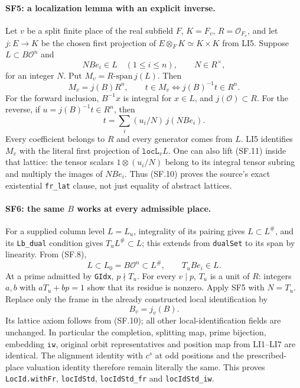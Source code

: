 \documentclass[11pt,a4paper]{article}
\numberwithin{equation}{section}
\theoremstyle{remark}\newtheorem{remark}[theorem]{Remark}
\begin{document}
\paragraph{SF5: a localization lemma with an explicit inverse.}
Let $v$ be a split finite place of the real subfield $F$,
$K=F_v$, $R=\mathcal O_{F_v}$, and let
$j:E\to K$ be the chosen first projection of
$E\otimes_FK\simeq K\times K$ from LI5.
Suppose $L\subset B\mathcal O^n$ and
\[
 N B e_i\in L\quad(1\le i\le n),\qquad N\in R^\times,
                                                               \tag{SF.9}
\]
for an integer $N$. Put $M_v=R\text{-span}\,j(L)$.
Then
\[
 M_v=j(B)R^n,\qquad
 t\in M_v\Longleftrightarrow j(B)^{-1}t\in R^n.         \tag{SF.10}
\]
For the forward inclusion, $B^{-1}x$ is integral for $x\in L$,
and $j(\mathcal O)\subset R$. For the reverse, if
$u=j(B)^{-1}t\in R^n$, then
\[
 t=\sum_i (u_i/N)\,j(NBe_i).                           \tag{SF.11}
\]
Every coefficient belongs to $R$ and every generator comes from $L$.
LI5 identifies $M_v$ with the literal first projection of
$\texttt{locL}_vL$. One can also lift (SF.11) inside that lattice:
the tensor scalars $1\otimes(u_i/N)$ belong to its integral tensor
subring and multiply the images of $NBe_i$. Thus (SF.10) proves the
source's exact existential \texttt{fr\_lat} clause, not just equality
of abstract lattices.

\paragraph{SF6: the same $B$ works at every admissible place.}
For a supplied column level $L=L_u$, integrality of its pairing gives
$L\subset L^\#$, and its \texttt{Lb\_dual} condition gives
$T_u L^\#\subset L$; this extends from \texttt{dualSet} to its span
by linearity. From (SF.8),
\[
 L\subset L_0=B\mathcal O^n\subset L^\#,
 \qquad T_uBe_i\in L.                                  \tag{SF.12}
\]
At a prime admitted by \texttt{GIdx}, $p\nmid T_u$. For every
$v\mid p$, $T_u$ is a unit of $R$: integers $a,b$ with
$aT_u+bp=1$ show that its residue is nonzero. Apply SF5 with $N=T_u$.
Replace only the frame in the already constructed local identification by
\[
 B_v=j_v(B).                                             \tag{SF.13}
\]
Its lattice axiom follows from (SF.10); all other local-identification
fields are unchanged. In particular the completion, splitting map,
prime bijection, embedding $\texttt{iw}$, original orbit representatives
and position map from LI1--LI7 are identical. The alignment identity
with $c^s$ at odd positions and the prescribed-place valuation identity
therefore remain literally the same. This proves
\texttt{LocId.withFr}, \texttt{locIdStd},
\texttt{locIdStd\_fr} and \texttt{locIdStd\_iw}.
\end{document}
